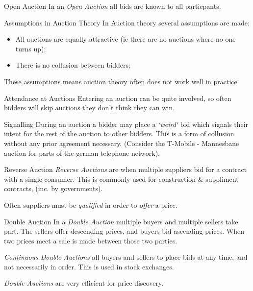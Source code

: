 \documentclass[11pt,a4paper]{article}
\begin{document}
\begin{definition}{Open Auction}
  In an \textit{Open Auction} all bids are known to all particpants.
\end{definition}

\begin{remark}{Assumptions in Auction Theory}
  In Auction theory several assumptions are made:
  \begin{itemize}
    \item All auctions are equally attractive (ie there are no auctions where no one turns up);
    \item There is no collusion between bidders;
  \end{itemize}
  These assumptions means auction theory often does not work well in practice.
\end{remark}

\begin{remark}{Attendance at Auctions}
  Entering an auction can be quite involved, so often bidders will skip auctions they don't think they can win.
\end{remark}

\begin{definition}{Signalling}
  During an auction a bidder may place a \textit{`weird`} bid which signals their intent for the rest of the auction to other bidders. This is a form of collusion without any prior agreement necessary. (Consider the T-Mobile - Mannesbane auction for parts of the german telephone network).
\end{definition}

\begin{definition}{Reverse Auction}
  \textit{Reverse Auctions} are when multiple suppliers bid for a contract with a single consumer. This is commonly used for construction \& suppliment contracts, (inc. by governments).
  \par Often suppliers must be \textit{qualified} in order to \textit{offer} a price.
\end{definition}

\begin{definition}{Double Auction}
  In a \textit{Double Auction} multiple buyers and multiple sellers take part. The sellers offer descending prices, and buyers bid ascending prices. When two prices meet a sale is made between those two parties.
  \par \textit{Continuous Double Auctions} all buyers and sellers to place bids at any time, and not necessarily in order. This is used in stock exchanges.
  \par \textit{Double Auctions} are very efficient for price discovery.
\end{definition}
\end{document}
